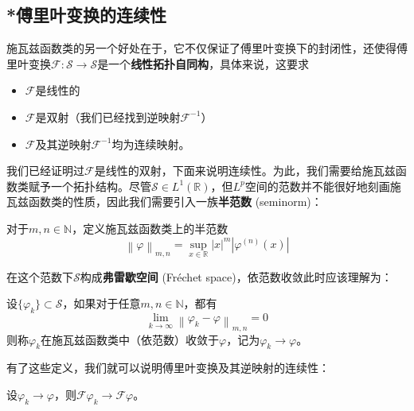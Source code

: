\documentclass{ctexbook}
\begin{document}
\subsection{*傅里叶变换的连续性}\label{sub:fourier_continuous}
施瓦兹函数类的另一个好处在于，它不仅保证了傅里叶变换下的封闭性，还使得傅里叶变换$\mathcal{F} :\mathcal{S} \to \mathcal{S} $是一个\textbf{线性拓扑自同构}，具体来说，这要求\begin{itemize}
    \item $\mathcal{F} $是线性的
    \item $\mathcal{F} $是双射（我们已经找到逆映射$\mathcal{F} ^{-1} $）
    \item $\mathcal{F} $及其逆映射$\mathcal{F} ^{-1} $均为连续映射。
\end{itemize}
我们已经证明过$\mathcal{F}$是线性的双射，下面来说明连续性。为此，我们需要给施瓦兹函数类赋予一个拓扑结构。尽管$\mathcal{S}\in L^1(\mathbb{R} )$，但$L^p$空间的范数并不能很好地刻画施瓦兹函数类的性质，因此我们需要引入一族\textbf{半范数} (seminorm)：
\begin{definition}[*施瓦兹函数类的半范数]
    对于$m,n\in\mathbb{N} $，定义施瓦兹函数类上的半范数
    \[\left\|\varphi\right\|_{m,n}=\sup_{x\in\mathbb{R} }|x|^m\left|\varphi^{(n)}(x)\right|\]
\end{definition}
在这个范数下$\mathcal{S} $构成\textbf{弗雷歇空间} (Fréchet space)，依范数收敛此时应该理解为：
\begin{definition}[*施瓦兹函数类中的收敛]
    设$\{\varphi_k\}\subset\mathcal{S} $，如果对于任意$m,n\in\mathbb{N} $，都有
    \[\lim_{k\to\infty}\left\|\varphi_k-\varphi\right\|_{m,n}=0\]
    则称$\varphi_k$在施瓦兹函数类中（依范数）收敛于$\varphi$，记为$\varphi_k\to \varphi$。
\end{definition}
有了这些定义，我们就可以说明傅里叶变换及其逆映射的连续性：
\begin{theorem}
    设$\varphi_k\to \varphi$，则$\mathcal{F} \varphi_k\to \mathcal{F} \varphi$。
\end{theorem}
\end{document}
